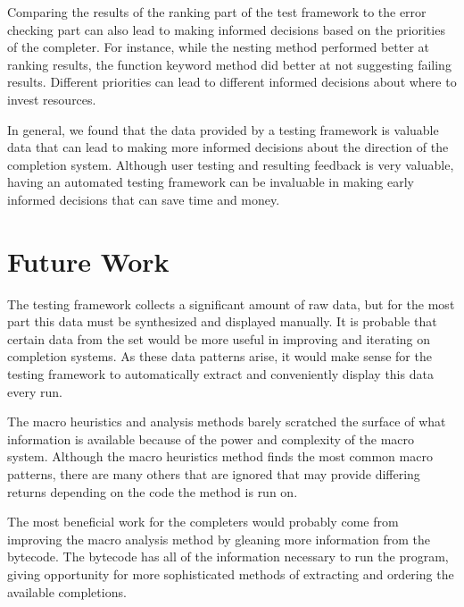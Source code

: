 \documentclass[ms,electronic,twosidetoc,letterpaper,chaptercenter,parttop,lol,lof,lot]{byumsphd}
\begin{document}
Comparing the results of the ranking part of the test framework to the error checking part can also lead to making informed decisions based on the priorities of the completer.
For instance, while the nesting method performed better at ranking results, the function keyword method did better at not suggesting failing results.
Different priorities can lead to different informed decisions about where to invest resources.

In general, we found that the data provided by a testing framework is valuable data that can lead to making more informed decisions about the direction of the completion system.
Although user testing and resulting feedback is very valuable, having an automated testing framework can be invaluable in making early informed decisions that can save time and money.

\section{Future Work}

The testing framework collects a significant amount of raw data, but for the most part this data must be synthesized and displayed manually.
It is probable that certain data from the set would be more useful in improving and iterating on completion systems.
As these data patterns arise, it would make sense for the testing framework to automatically extract and conveniently display this data every run.

The macro heuristics and analysis methods barely scratched the surface of what information is available because of the power and complexity of the macro system.
Although the macro heuristics method finds the most common macro patterns, there are many others that are ignored that may provide differing returns depending on the code the method is run on.

The most beneficial work for the completers would probably come from improving the macro analysis method by gleaning more information from the bytecode.
The bytecode has all of the information necessary to run the program, giving opportunity for more sophisticated methods of extracting and ordering the available completions.



\end{document}
